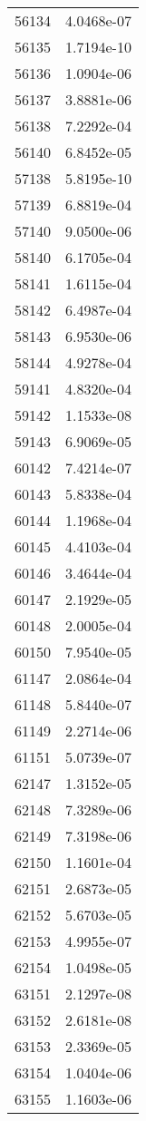 \begin{table}[h!]
\begin{tabular}{|| c || c |}
56134 & 4.0468e-07 \\
56135 & 1.7194e-10 \\
56136 & 1.0904e-06 \\
56137 & 3.8881e-06 \\
56138 & 7.2292e-04 \\
56140 & 6.8452e-05 \\
57138 & 5.8195e-10 \\
57139 & 6.8819e-04 \\
57140 & 9.0500e-06 \\
58140 & 6.1705e-04 \\
58141 & 1.6115e-04 \\
58142 & 6.4987e-04 \\
58143 & 6.9530e-06 \\
58144 & 4.9278e-04 \\
59141 & 4.8320e-04 \\
59142 & 1.1533e-08 \\
59143 & 6.9069e-05 \\
60142 & 7.4214e-07 \\
60143 & 5.8338e-04 \\
60144 & 1.1968e-04 \\
60145 & 4.4103e-04 \\
60146 & 3.4644e-04 \\
60147 & 2.1929e-05 \\
60148 & 2.0005e-04 \\
60150 & 7.9540e-05 \\
61147 & 2.0864e-04 \\
61148 & 5.8440e-07 \\
61149 & 2.2714e-06 \\
61151 & 5.0739e-07 \\
62147 & 1.3152e-05 \\
62148 & 7.3289e-06 \\
62149 & 7.3198e-06 \\
62150 & 1.1601e-04 \\
62151 & 2.6873e-05 \\
62152 & 5.6703e-05 \\
62153 & 4.9955e-07 \\
62154 & 1.0498e-05 \\
63151 & 2.1297e-08 \\
63152 & 2.6181e-08 \\
63153 & 2.3369e-05 \\
63154 & 1.0404e-06 \\
63155 & 1.1603e-06 \\

\end{tabular}
\end{table}
